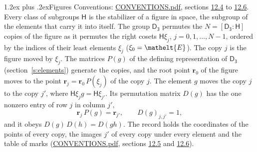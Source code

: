 \documentclass[10pt,a4paper]{article}
\makeatletter
\renewcommand\section{\@startsection{section}{1}{\z@}{-3ex plus -1ex minus -.2ex}%
  {1.2ex plus .2ex}{\normalfont\large\sffamily\bfseries\color{parttitle}}}
\numberwithin{equation}{section}
\newcommand{\eltfont}[1]{{\let\sigma\eltsigma\mathelt{#1}}}
\newcommand{\grp}[1]{\mathsf{#1}}
\newcommand{\cls}[1]{\eltfont{#1}}
\newcommand{\pointr}{\mathbf{r}}
\makeatother
\begin{document}
\section{Figures}\label{s:permutation}
Conventions: \href{../../CONVENTIONS.pdf}{CONVENTIONS.pdf}, sections \href{../../CONVENTIONS.pdf\#conv.12.4}{12.4} to \href{../../CONVENTIONS.pdf\#conv.12.6}{12.6}.
Every class of subgroups $\grp{H}$ is the stabilizer of a figure in space, the subgroup of the elements that carry it into itself. \label{n:local.orbit.size}\label{n:element.coset.least}\label{n:index.coset}The group $\grp{D_{3}}$ permutes the $N = [\grp{D_{3}} : \grp{H}]$ copies of the figure as it permutes the right cosets $\grp{H}\xi_j$, $j = 0, 1, \dots, N - 1$, ordered by the indices of their least elements $\xi_j$ ($\xi_0 = \cls{E}$). The copy $j$ is the figure moved by $\xi_j$. The matrices $P(g)$ of the defining representation of $\grp{D_{3}}$ (section~\ref{s:elements}) generate the copies, and the root point $\pointr_0$ of the figure moves to the point $\pointr_j = \pointr_0\, P(\xi_j)$ of the copy $j$. \label{n:local.coset.image}The element $g$ moves the copy $j$ to the copy $j'$, where $\grp{H}\xi_j g = \grp{H}\xi_{j'}$. \label{n:local.matrix.permutation}Its permutation matrix $D(g)$ has the one nonzero entry of row $j$ in column $j'$,
\begin{equation}\label{e:perm.matrix}\pointr_j\, P(g) = \pointr_{j'}, \qquad D(g)_{j,j'} = 1,\end{equation}
and it obeys $D(g)\, D(h) = D(gh)$. The record holds the coordinates of the points of every copy, the images $j'$ of every copy under every element and the table of marks (\href{../../CONVENTIONS.pdf}{CONVENTIONS.pdf}, sections \href{../../CONVENTIONS.pdf\#conv.12.5}{12.5} and \href{../../CONVENTIONS.pdf\#conv.12.6}{12.6}).
\end{document}
